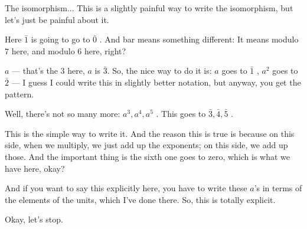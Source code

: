\begin{speech}[00:41:19 - 00:42:48]
The isomorphism... This is a slightly painful way to write the isomorphism, but let's just be painful about it.

Here $\bar{1}$ is going to go to $\bar{0}$ . And bar means something different: It means modulo $7$ here, and modulo $6$ here, right?

$a$ --- that's the $3$ here, $a$ is $\bar{3}$. So, the nice way to do it is: $a$ goes to $\bar{1}$ , $a^2$ goes to $\bar{2}$  --- I guess I could write this in slightly better notation, but anyway, you get the pattern.

Well, there's not so many more: $a^3, a^4, a^5$ . This goes to $\bar{3}, \bar{4}, \bar{5}$ .

This is the simple way to write it. And the reason this is true is because on this side, when we multiply, we just add up the exponents; on this side, we add up those. And the important thing is the sixth one goes to zero, which is what we have here, okay?

And if you want to say this explicitly here, you have to write these $a$'s in terms of the elements of the units, which I've done there. So, this is totally explicit.

Okay, let's stop. 
\end{speech}

